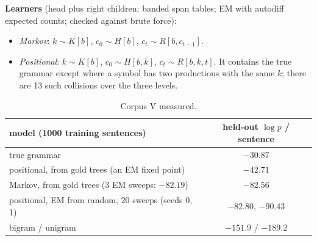 \documentclass[11pt]{article}
\theoremstyle{definition}
\theoremstyle{remark}
\newcommand{\st}[1]{\textsf{\small\color{gray}#1}}
\begin{document}
\textbf{Learners} (head plus right children; banded span tables; EM with autodiff expected counts; checked against brute force):
\begin{itemize}
  \item \emph{Markov}: $k\sim K[b]$, $c_0\sim H[b]$, $c_t\sim R[b,c_{t-1}]$.
  \item \emph{Positional}: $k\sim K[b]$, $c_0\sim H[b,k]$, $c_t\sim R[b,k,t]$. It contains the true grammar except where a symbol has two productions with the same $k$; there are 13 such collisions over the three levels.
\end{itemize}
\begin{table}[h]\centering\small
\begin{tabular}{lc}
\toprule
model (1000 training sentences) & held-out $\log p$ / sentence\\
\midrule
true grammar & $-30.87$\\
positional, from gold trees (an EM fixed point) & $-42.71$\\
Markov, from gold trees (3 EM sweeps: $-82.19$) & $-82.56$\\
positional, EM from random, 20 sweeps (seeds 0, 1) & $-82.80$, $-90.43$\\
bigram / unigram & $-151.9$ / $-189.2$\\
\bottomrule
\end{tabular}
\caption{Corpus V \st{measured}.}
\end{table}
\end{document}
